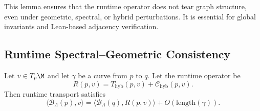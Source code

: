 \begin{remark}
This lemma ensures that the runtime operator does not tear graph
structure, even under geometric, spectral, or hybrid perturbations.  
It is essential for global invariants and Lean-based adjacency
verification.
\end{remark}

\subsection{Runtime Spectral--Geometric Consistency}

\begin{lemma}
Let $v \in T_p\M$ and let $\gamma$ be a curve from $p$ to $q$.  
Let the runtime operator be
\[
R(p,v)
=
T_{\mathrm{hyb}}(p,v)
+
\mathcal{C}_{\mathrm{hyb}}(p,v).
\]
Then runtime transport satisfies
\[
\langle \mathcal{B}_\Lambda(p), v \rangle
=
\langle \mathcal{B}_\Lambda(q), R(p,v) \rangle
+ O(\mathrm{length}(\gamma)).
\]
\end{lemma}

